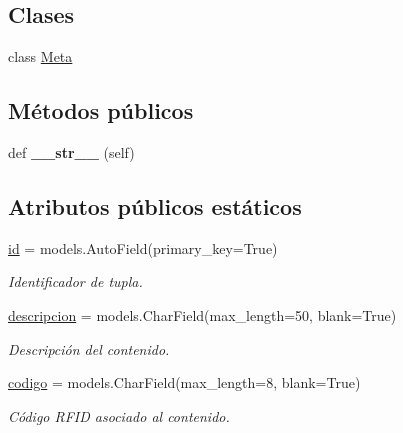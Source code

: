 \subsection*{Clases}
\begin{DoxyCompactItemize}
\item 
class \hyperlink{classappEmotionIOT_1_1models_1_1Contenido_1_1Meta}{Meta}
\end{DoxyCompactItemize}
\subsection*{Métodos públicos}
\begin{DoxyCompactItemize}
\item 
def {\bfseries \+\_\+\+\_\+str\+\_\+\+\_\+} (self)\hypertarget{classappEmotionIOT_1_1models_1_1Contenido_ae36991b09cf2b755f0b71c0c33efec49}{}\label{classappEmotionIOT_1_1models_1_1Contenido_ae36991b09cf2b755f0b71c0c33efec49}

\end{DoxyCompactItemize}
\subsection*{Atributos públicos estáticos}
\begin{DoxyCompactItemize}
\item 
\hyperlink{classappEmotionIOT_1_1models_1_1Contenido_a237ee5ee65b5a383f6e8199e8e6f0b1f}{id} = models.\+Auto\+Field(primary\+\_\+key=True)\hypertarget{classappEmotionIOT_1_1models_1_1Contenido_a237ee5ee65b5a383f6e8199e8e6f0b1f}{}\label{classappEmotionIOT_1_1models_1_1Contenido_a237ee5ee65b5a383f6e8199e8e6f0b1f}

\begin{DoxyCompactList}\small\item\em Identificador de tupla. \end{DoxyCompactList}\item 
\hyperlink{classappEmotionIOT_1_1models_1_1Contenido_af80d7a0b7f38145a82349cc69f10c555}{descripcion} = models.\+Char\+Field(max\+\_\+length=50, blank=True)\hypertarget{classappEmotionIOT_1_1models_1_1Contenido_af80d7a0b7f38145a82349cc69f10c555}{}\label{classappEmotionIOT_1_1models_1_1Contenido_af80d7a0b7f38145a82349cc69f10c555}

\begin{DoxyCompactList}\small\item\em Descripción del contenido. \end{DoxyCompactList}\item 
\hyperlink{classappEmotionIOT_1_1models_1_1Contenido_abfb3aab54ecea94b5382c00cb1b59fde}{codigo} = models.\+Char\+Field(max\+\_\+length=8, blank=True)\hypertarget{classappEmotionIOT_1_1models_1_1Contenido_abfb3aab54ecea94b5382c00cb1b59fde}{}\label{classappEmotionIOT_1_1models_1_1Contenido_abfb3aab54ecea94b5382c00cb1b59fde}

\begin{DoxyCompactList}\small\item\em Código R\+F\+ID asociado al contenido. \end{DoxyCompactList}\end{DoxyCompactItemize}


